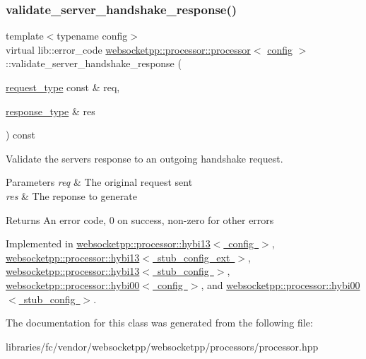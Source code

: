 \mbox{\label{classwebsocketpp_1_1processor_1_1processor_ab1228fa9350d9646379888ad528fd4c4}} 
\subsubsection{\texorpdfstring{validate\+\_\+server\+\_\+handshake\+\_\+response()}{validate\_server\_handshake\_response()}}
{\footnotesize\ttfamily template$<$typename config$>$ \\
virtual lib\+::error\+\_\+code \mbox{\hyperlink{classwebsocketpp_1_1processor_1_1processor}{websocketpp\+::processor\+::processor}}$<$ \mbox{\hyperlink{classconfig}{config}} $>$\+::validate\+\_\+server\+\_\+handshake\+\_\+response (\begin{DoxyParamCaption}\item[{\mbox{\hyperlink{classwebsocketpp_1_1http_1_1parser_1_1request}{request\+\_\+type}} const \&}]{req,  }\item[{\mbox{\hyperlink{classwebsocketpp_1_1http_1_1parser_1_1response}{response\+\_\+type}} \&}]{res }\end{DoxyParamCaption}) const\hspace{0.3cm}{\ttfamily [pure virtual]}}



Validate the server\textquotesingle{}s response to an outgoing handshake request. 


\begin{DoxyParams}{Parameters}
{\em req} & The original request sent \\
\hline
{\em res} & The reponse to generate \\
\hline
\end{DoxyParams}
\begin{DoxyReturn}{Returns}
An error code, 0 on success, non-\/zero for other errors 
\end{DoxyReturn}


Implemented in \mbox{\hyperlink{classwebsocketpp_1_1processor_1_1hybi13_a8b3cea2f1526b4982e0836c5705584a8}{websocketpp\+::processor\+::hybi13$<$ config $>$}}, \mbox{\hyperlink{classwebsocketpp_1_1processor_1_1hybi13_a8b3cea2f1526b4982e0836c5705584a8}{websocketpp\+::processor\+::hybi13$<$ stub\+\_\+config\+\_\+ext $>$}}, \mbox{\hyperlink{classwebsocketpp_1_1processor_1_1hybi13_a8b3cea2f1526b4982e0836c5705584a8}{websocketpp\+::processor\+::hybi13$<$ stub\+\_\+config $>$}}, \mbox{\hyperlink{classwebsocketpp_1_1processor_1_1hybi00_a8c7e9edc5eec497d908095ab7a848f2e}{websocketpp\+::processor\+::hybi00$<$ config $>$}}, and \mbox{\hyperlink{classwebsocketpp_1_1processor_1_1hybi00_a8c7e9edc5eec497d908095ab7a848f2e}{websocketpp\+::processor\+::hybi00$<$ stub\+\_\+config $>$}}.



The documentation for this class was generated from the following file\+:\begin{DoxyCompactItemize}
\item 
libraries/fc/vendor/websocketpp/websocketpp/processors/processor.\+hpp\end{DoxyCompactItemize}
